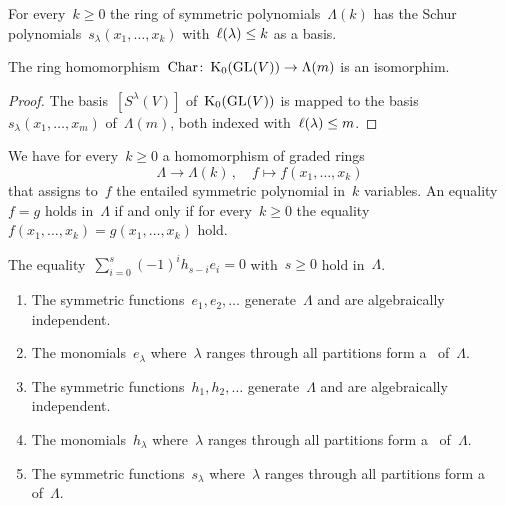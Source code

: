 \documentclass[a4paper,10pt]{scrartcl}
\begin{document}
\begin{proposition}
  For every~$k \geq 0$ the ring of symmetric polynomials~$\Lambda(k)$ has the Schur polynomials~$s_\lambda(x_1, \dotsc, x_k)$ with~$\operatorname{\ell}(\lambda) \leq k$ as a basis.
\end{proposition}

\begin{corollary}
  The ring homomorphism~$\operatorname{Char} \colon \operatorname{K}_0(\operatorname{GL}(V)) \to \Lambda(m)$ is an isomorphim.
\end{corollary}

\begin{proof}
  The basis~$[S^\lambda(V)]$ of~$\operatorname{K}_0(\operatorname{GL}(V))$ is mapped to the basis~$s_\lambda(x_1, \dotsc, x_m)$ of~$\Lambda(m)$, both indexed with~$\operatorname{\ell}(\lambda) \leq m$.
\end{proof}


We have for every~$k \geq 0$ a homomorphism of graded rings
\[
  \Lambda
  \to
  \Lambda(k) \,,
  \quad
  f
  \mapsto
  f(x_1, \dotsc, x_k)
\]
that assigns to~$f$ the entailed symmetric polynomial in~$k$ variables.
An equality~$f = g$ holds in~$\Lambda$ if and only if for every~$k \geq 0$ the equality~$f(x_1, \dotsc, x_k) = g(x_1, \dotsc, x_k)$ hold.

\begin{example}
  The equality~$\sum_{i=0}^s (-1)^i h_{s-i} e_i = 0$ with~$s \geq 0$ hold in~$\Lambda$.
\end{example}

\begin{proposition}
  \leavevmode
  \begin{enumerate}
    \item
      The symmetric functions~$e_1, e_2, \dotsc$ generate~$\Lambda$ and are algebraically independent.
    \item
      The monomials~$e_\lambda$ where~$\lambda$ ranges through all partitions form a~{\basis{$\Integer$}} of~$\Lambda$.
    \item
      The symmetric functions~$h_1, h_2, \dotsc$ generate~$\Lambda$ and are algebraically independent.
    \item
      The monomials~$h_\lambda$ where~$\lambda$ ranges through all partitions form a~{\basis{$\Integer$}} of~$\Lambda$.
    \item
      The symmetric functions~$s_\lambda$ where~$\lambda$ ranges through all partitions form a~{\basis{$\Integer$}} of~$\Lambda$.
  \end{enumerate}
\end{proposition}
\end{document}
